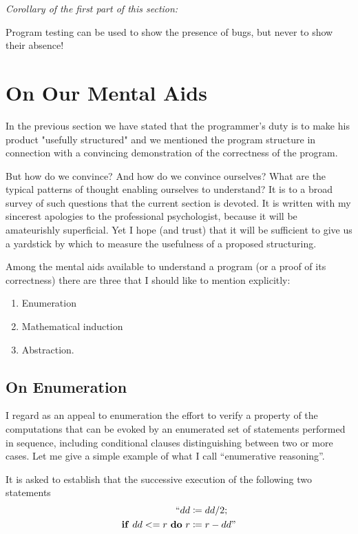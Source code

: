\noindent
\textit{Corollary of the first part of this section:}

Program testing can be used to show the presence of bugs, but never to
show their absence!

\section{On Our Mental Aids}

In the previous section we have stated that the programmer's duty is to make his product "usefully structured" and we mentioned the program structure in connection with a convincing demonstration of the correctness of the program.

But how do we convince? And how do we convince ourselves? What are the typical patterns of thought enabling ourselves to understand? It is to a broad survey of such questions that the current section is devoted. It is written with my sincerest apologies to the professional psychologist, because it will be amateurishly superficial. Yet I hope (and trust) that it will be sufficient to give us a yardstick by which to measure the usefulness of a proposed structuring.

Among the mental aids available to understand a program (or a proof of its correctness) there are three that I should like to mention explicitly:

\begin{enumerate}[label=(\arabic*)]
\item Enumeration
\item Mathematical induction
\item Abstraction.
\end{enumerate}

\subsection{On Enumeration}

I regard as an appeal to enumeration the effort to verify a property of the computations that can be evoked by an enumerated set of statements performed in sequence, including conditional clauses distinguishing between two or more cases. Let me give a simple example of what I call ``enumerative reasoning''.

It is asked to establish that the successive execution of the following two statements
\begin{equation*}
	\begin{split}
		\text{``}dd &\coloneq dd/2; \\
		\text{\textbf{if} } dd <= r \text{ \textbf{do} } r &\coloneq r - dd\text{''}
	\end{split}
\end{equation*}


